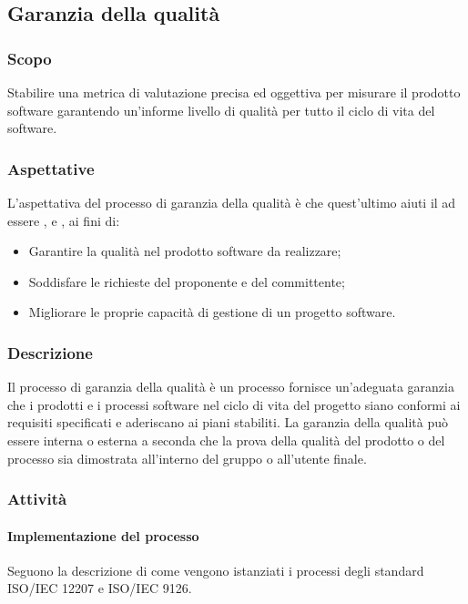 \subsection{Garanzia della qualità}
\subsubsection{Scopo}
Stabilire una metrica di valutazione precisa ed oggettiva per misurare il prodotto software garantendo un'informe livello di qualità per tutto il ciclo di vita del software.
\subsubsection{Aspettative}
L'aspettativa del processo di garanzia della qualità è che quest'ultimo aiuti il \Gruppo{} ad essere ,  e , ai fini di:
\begin{itemize}
    \item Garantire la qualità nel prodotto software da realizzare;
    \item Soddisfare le richieste del proponente e del committente;
    \item Migliorare le proprie capacità di gestione di un progetto software.
\end{itemize}
\subsubsection{Descrizione}
Il processo di garanzia della qualità è un processo fornisce un'adeguata garanzia che i prodotti e i processi software nel ciclo di vita del progetto siano conformi ai requisiti specificati e aderiscano ai piani stabiliti. La garanzia della qualità può essere interna o esterna a seconda che la prova della qualità del prodotto o del processo sia dimostrata all'interno del gruppo o all'utente finale.
\subsubsection{Attività}
\paragraph{Implementazione del processo}
Seguono la descrizione di come vengono istanziati i processi degli standard ISO/IEC 12207 e ISO/IEC 9126.



